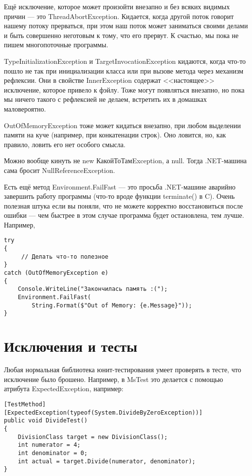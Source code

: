 \documentclass{../../text-style}
\begin{document}
Ещё исключение, которое может произойти внезапно и без всяких видимых причин --- это ThreadAbortException. Кидается, когда другой поток говорит нашему потоку прерваться, при этом наш поток может заниматься своими делами и быть совершенно неготовым к тому, что его прервут. К счастью, мы пока не пишем многопоточные программы.

TypeInitializationException и TargetInvocationException кидаются, когда что-то пошло не так при инициализации класса или при вызове метода через механизм рефлексии. Они в свойстве InnerException содержат <<настоящее>> исключение, которое привело к фэйлу. Тоже могут появляться внезапно, но пока мы ничего такого с рефлексией не делаем, встретить их в домашках маловероятно.

OutOfMemoryException тоже может кидаться внезапно, при любом выделении памяти на куче (например, при конкатенации строк). Оно ловится, но, как правило, ловить его нет особого смысла.

Можно вообще кинуть не new КакойТоТамException, а null. Тогда .NET-машина сама бросит NullReferenceException.

Есть ещё метод Environment.FailFast --- это просьба .NET-машине аварийно завершить работу программы (что-то вроде функции terminate() в C). Очень полезная штука если вы поняли, что не можете корректно восстановиться после ошибки --- чем быстрее в этом случае программа будет остановлена, тем лучше. Например,

\begin{verbatim}
try 
{
     // Делать что-то полезное
}
catch (OutOfMemoryException e) 
{
    Console.WriteLine("Закончилась память :(");
    Environment.FailFast(
        String.Format($"Out of Memory: {e.Message}"));
}
\end{verbatim}

\section{Исключения и тесты}

Любая нормальная библиотека юнит-тестирования умеет проверять в тесте, что исключение было брошено. Например, в MsTest это делается с помощью атрибута ExpectedException, например: 

\begin{verbatim}
[TestMethod]
[ExpectedException(typeof(System.DivideByZeroException))]
public void DivideTest()
{
    DivisionClass target = new DivisionClass();
    int numerator = 4;
    int denominator = 0;
    int actual = target.Divide(numerator, denominator);
}
\end{verbatim}
\end{document}
